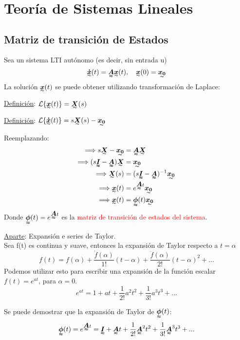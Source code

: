 \chapter{Teoría de Sistemas Lineales}

\section{Matriz de transición de Estados}
Sea un sistema LTI autónomo (es decir, sin entrada u)
\begin{align*}
    \tend{\dot{x}}(t)=\tenq{A}\tend{x}(t), \quad \tend{x}(0)=\tend{x_0}
\end{align*}
La solución $\tend{x}(t)$ se puede obtener utilizando transformación de Laplace:\\
\par \underline{Definición}: $\mathcal{L}\{\tend{x}(t)\}=\tend{X}(s)$\\
\par \underline{Definición}: $\mathcal{L}\{\tend{\dot{x}}(t)\}=s\tend{X}(s)-\tend{x_0}$\\
\par Reemplazando:
\begin{align*}
    \Longrightarrow s\tend{X}-\tend{x_0} &= \tenq{A}\tend{X}\\
    \Longrightarrow (s\tenq{I}-\tenq{A})\tend{X} &=\tend{x_0}\\
    \Longrightarrow \tend{X}(s) &= (s\tenq{I}-\tenq{A})^{-1}\tend{x_0}\\
    \Longrightarrow \tend{x}(t) &= e^{\tenq{A}t}\tend{x_0}\\
    \Longrightarrow \tend{x}(t) &= \tenq{\phi}(t)\tend{x_0}
\end{align*}
Donde $\tenq{\phi}(t)=e^{\tenq{A}t}$ es la \textcolor{red}{matriz de transición de estados del sistema}. \\
\par \underline{Aparte}: Expansión e series de Taylor.\\
Sea f(t) es continua y suave, entonces la expansión de Taylor respecto a $t=\alpha$
$$f(t)=f(\alpha)+\frac{\dot{f}(\alpha)}{1!}(t-\alpha)+\frac{\ddot{f}(\alpha)}{2!}(t-\alpha)^2+... $$
Podemos utilizar esto para escribir una expansión de la función escalar $f(t)=e^{at}$, para $\alpha=0$.
$$e^{at}=1+at+\frac{1}{2!}a^2t^2+\frac{1}{3!}a^3t^3+... $$

\par Se puede demostrar que la expansión de Taylor de $\tenq{\phi}(t)$:
\begin{align*}
    \tenq{\phi}(t)=e^{\tenq{A}t}=\tenq{I}+\tenq{A}t+\frac{1}{2!}\tenq{A}^2t^2+\frac{1}{3!}\tenq{A}^3t^3+...
\end{align*}

